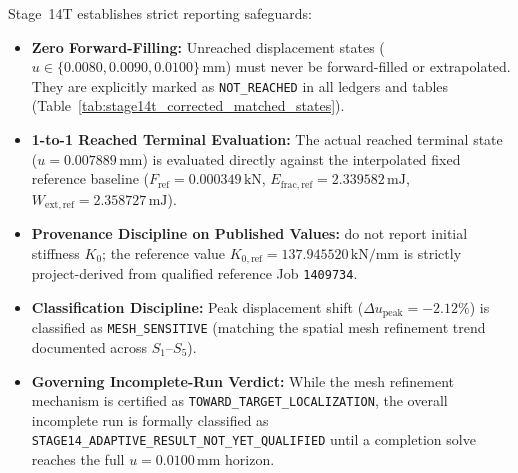 Stage~14T establishes strict reporting safeguards:
\begin{itemize}
    \item \textbf{Zero Forward-Filling:} Unreached displacement states ($u \in \{0.0080, 0.0090, 0.0100\}\,\mathrm{mm}$) must never be forward-filled or extrapolated. They are explicitly marked as \texttt{NOT\_REACHED} in all ledgers and tables (Table~\ref{tab:stage14t_corrected_matched_states}).
    \item \textbf{1-to-1 Reached Terminal Evaluation:} The actual reached terminal state ($u = 0.007889\,\mathrm{mm}$) is evaluated directly against the interpolated fixed reference baseline ($F_{\mathrm{ref}} = 0.000349\,\mathrm{kN}$, $E_{\mathrm{frac},\mathrm{ref}} = 2.339582\,\mathrm{mJ}$, $W_{\mathrm{ext},\mathrm{ref}} = 2.358727\,\mathrm{mJ}$).
    \item \textbf{Provenance Discipline on Published Values:} \citet{pandey2025} do not report initial stiffness $K_0$; the reference value $K_{0,\mathrm{ref}} = 137.945520\,\mathrm{kN/mm}$ is strictly project-derived from qualified reference Job \texttt{1409734}.
    \item \textbf{Classification Discipline:} Peak displacement shift ($\Delta u_{\mathrm{peak}} = -2.12\%$) is classified as \texttt{MESH\_SENSITIVE} (matching the spatial mesh refinement trend documented across $S_1$--$S_5$).
    \item \textbf{Governing Incomplete-Run Verdict:} While the mesh refinement mechanism is certified as \texttt{TOWARD\_TARGET\_LOCALIZATION}, the overall incomplete run is formally classified as \texttt{STAGE14\_ADAPTIVE\_RESULT\_NOT\_YET\_QUALIFIED} until a completion solve reaches the full $u = 0.0100\,\mathrm{mm}$ horizon.
\end{itemize}

